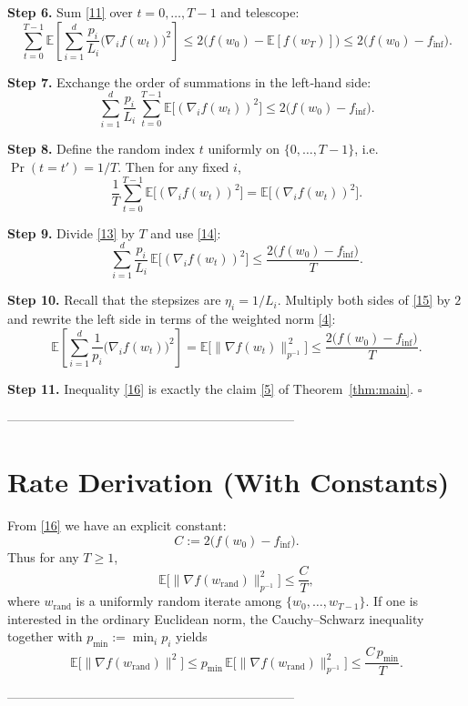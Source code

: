 \documentclass{article}
\newcommand{\E}{\mathbb{E}}
\begin{document}
\noindent\textbf{Step 6.}  Sum \eqref{11} over $t=0,\dots,T-1$ and telescope:
\[
\sum_{t=0}^{T-1}\E\!\left[\sum_{i=1}^{d}\frac{p_i}{L_i}\big(\nabla_i f(w_t)\big)^{2}\right]
\le 2\big(f(w_0)-\E[f(w_T)]\big)
\le 2\big(f(w_0)-f_{\inf}\big).
\tag{12}
\]

\noindent\textbf{Step 7.}  Exchange the order of summations in the left‑hand side:
\[
\sum_{i=1}^{d}\frac{p_i}{L_i}\,\sum_{t=0}^{T-1}\E\!\big[(\nabla_i f(w_t))^{2}\big]
\le 2\big(f(w_0)-f_{\inf}\big).
\tag{13}
\]

\noindent\textbf{Step 8.}  Define the random index $t$ uniformly on $\{0,\dots,T-1\}$, i.e.
$\Pr(t=t')=1/T$.  Then for any fixed $i$,
\[
\frac{1}{T}\sum_{t=0}^{T-1}\E\!\big[(\nabla_i f(w_t))^{2}\big]
= \E\!\big[(\nabla_i f(w_t))^{2}\big].
\tag{14}
\]

\noindent\textbf{Step 9.}  Divide \eqref{13} by $T$ and use \eqref{14}:
\[
\sum_{i=1}^{d}\frac{p_i}{L_i}\,\E\!\big[(\nabla_i f(w_t))^{2}\big]
\le \frac{2\big(f(w_0)-f_{\inf}\big)}{T}.
\tag{15}
\]

\noindent\textbf{Step 10.}  Recall that the stepsizes are $\eta_i=1/L_i$.  Multiply both sides of \eqref{15} by $2$ and rewrite the left side in terms of the weighted norm \eqref{4}:
\[
\E\!\left[\sum_{i=1}^{d}\frac{1}{p_i}\big(\nabla_i f(w_t)\big)^{2}\right]
= \E\!\big[\|\nabla f(w_t)\|_{p^{-1}}^{\,2}\big]
\le \frac{2\big(f(w_0)-f_{\inf}\big)}{T}.
\tag{16}
\]

\noindent\textbf{Step 11.}  Inequality \eqref{16} is exactly the claim \eqref{5} of Theorem~\ref{thm:main}.  $\square$

--------------------------------------------------------------------

\section*{Rate Derivation (With Constants)}
From \eqref{16} we have an explicit constant:
\[
C:=2\big(f(w_0)-f_{\inf}\big).
\]
Thus for any $T\ge1$,
\[
\E\!\big[\|\nabla f(w_{\text{rand}})\|_{p^{-1}}^{2}\big]\le \frac{C}{T},
\]
where $w_{\text{rand}}$ is a uniformly random iterate among $\{w_0,\dots,w_{T-1}\}$.
If one is interested in the ordinary Euclidean norm, the Cauchy–Schwarz inequality together with $p_{\min}:=\min_i p_i$ yields
\[
\E\!\big[\|\nabla f(w_{\text{rand}})\|^{2}\big]
\le p_{\min}\,\E\!\big[\|\nabla f(w_{\text{rand}})\|_{p^{-1}}^{2}\big]
\le \frac{C\,p_{\min}}{T}.
\]

--------------------------------------------------------------------
\end{document}
